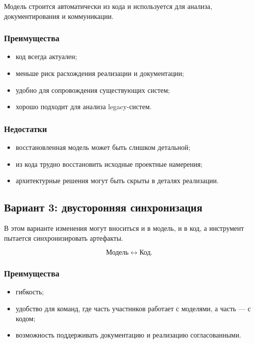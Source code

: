 \documentclass[12pt,a4paper]{article}
\begin{document}
Модель строится автоматически из кода и используется для анализа, документирования и коммуникации.

\subsubsection*{Преимущества}
\begin{itemize}
    \item код всегда актуален;
    \item меньше риск расхождения реализации и документации;
    \item удобно для сопровождения существующих систем;
    \item хорошо подходит для анализа legacy-систем.
\end{itemize}

\subsubsection*{Недостатки}
\begin{itemize}
    \item восстановленная модель может быть слишком детальной;
    \item из кода трудно восстановить исходные проектные намерения;
    \item архитектурные решения могут быть скрыты в деталях реализации.
\end{itemize}

\subsection{Вариант 3: двусторонняя синхронизация}

В этом варианте изменения могут вноситься и в модель, и в код, а инструмент пытается синхронизировать артефакты.

\[
\text{Модель}
\leftrightarrow
\text{Код}.
\]

\subsubsection*{Преимущества}
\begin{itemize}
    \item гибкость;
    \item удобство для команд, где часть участников работает с моделями, а часть --- с кодом;
    \item возможность поддерживать документацию и реализацию согласованными.
\end{itemize}
\end{document}
